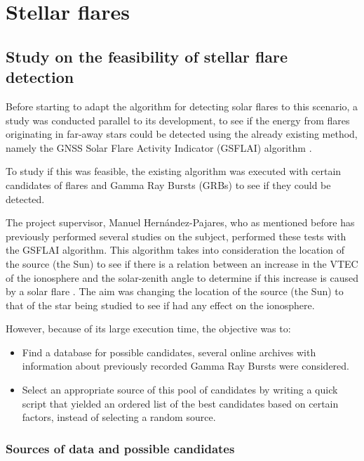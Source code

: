 \chapter{Stellar flares}

\section{Study on the feasibility of stellar flare detection}

Before starting to adapt the algorithm for detecting solar flares to this scenario, a study was conducted parallel to its development, to see if the energy from flares originating in far-away stars could be detected using the already existing method, namely the GNSS Solar Flare Activity Indicator (GSFLAI) algorithm \cite{hernandez2012gnss}.

To study if this was feasible, the existing algorithm was executed with certain candidates of flares and Gamma Ray Bursts (GRBs) to see if they could be detected.

The project supervisor, Manuel Hernández-Pajares, who as mentioned before has previously performed several studies on the subject, performed these tests with the GSFLAI algorithm. This algorithm takes into consideration the location of the source (the Sun) to see if there is a relation between an increase in the VTEC of the ionosphere and the solar-zenith angle to determine if this increase is caused by a solar flare \cite{hernandez2012gnss}. The aim was changing the location of the source (the Sun) to that of the star being studied to see if had any effect on the ionosphere.

However, because of its large execution time, the objective was to:

\begin{itemize}
	\item Find a database for possible candidates, several online archives with information about previously recorded Gamma Ray Bursts were considered.
	\item Select an appropriate source of this pool of candidates by writing a quick script that yielded an ordered list of the best candidates based on certain factors, instead of selecting a random source.
\end{itemize}

\subsection{Sources of data and possible candidates}

